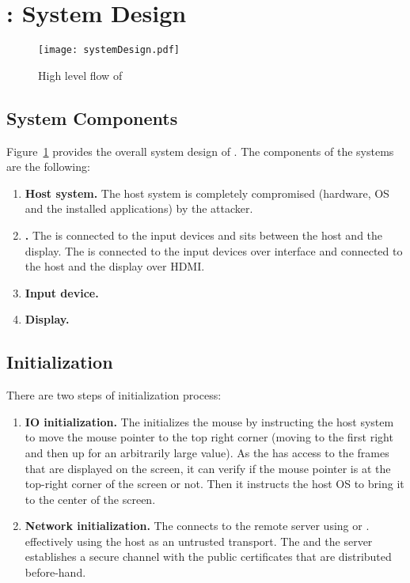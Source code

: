 \section{\name: System Design}
\label{sec:systemDesign}


\begin{figure}[t]
\centering
\texttt{[image: systemDesign.pdf]}
\caption{High level flow of \name}
\label{fig:systemDesign}
\centering
\end{figure}



\subsection{System Components}


Figure~\ref{fig:systemDesign} provides the overall system design of \name. The components of the systems are the following:

\begin{enumerate}
  \item \textbf{Host system.} The host system is completely compromised (hardware, OS and the installed applications) by the attacker.
  \item \textbf{\device.} The \device is connected to the input devices and sits between the host and the display. The \device is connected to the input devices over \usb interface and connected to the host and the display over HDMI.
  \item \textbf{Input device.}
  \item \textbf{Display.}
  
\end{enumerate}

\subsection{Initialization} 

There are two steps of initialization process:

\begin{enumerate}
  \item\textbf{IO initialization.} The \device initializes the mouse by instructing the host system to move the mouse pointer to the top right corner (moving to the first right and then up for an arbitrarily large value). As the \device has access to the frames that are displayed on the screen, it can verify if the mouse pointer is at the top-right corner of the screen or not. Then it instructs the host OS to bring it to the center of the screen.
  
  \item\textbf{Network initialization.} The \device connects to the remote server using \webusb or \webbt. effectively using the host as an untrusted transport. The \device and the server establishes a secure channel with the public certificates that are distributed before-hand.
\end{enumerate}


